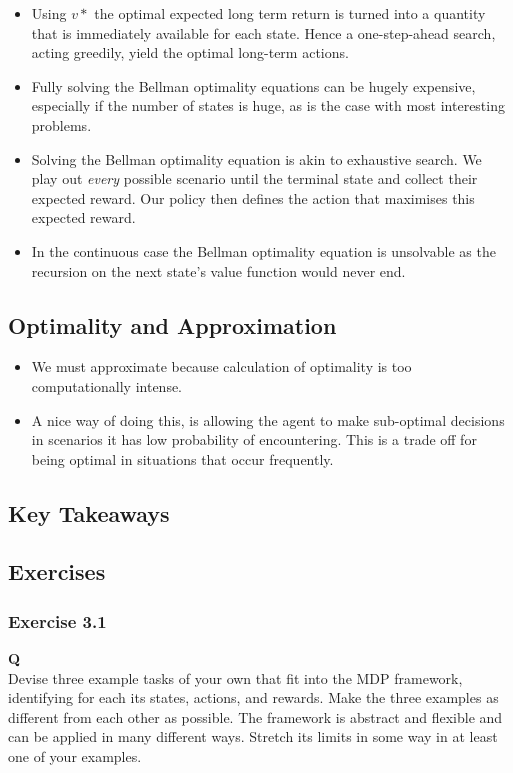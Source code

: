 \begin{itemize}
\item Using \(v*\) the optimal expected long term return is turned into a quantity that is immediately available for each state. Hence a one-step-ahead search, acting greedily, yield the optimal long-term actions.
\item Fully solving the Bellman optimality equations can be hugely expensive, especially if the number of states is huge, as is the case with most interesting problems.
\item Solving the Bellman optimality equation is akin to exhaustive search. We play out \textit{every} possible scenario until the terminal state and collect their expected reward. Our policy then defines the action that maximises this expected reward. 
\item In the continuous case the Bellman optimality equation is unsolvable as the recursion on the next state's value function would never end.
\end{itemize}

\subsection{Optimality and Approximation}
\begin{itemize}
	\item We must approximate because calculation of optimality is too computationally intense.
	\item A nice way of doing this, is allowing the agent to make sub-optimal decisions in scenarios it has low probability of encountering. This is a trade off for being optimal in situations that occur frequently.
\end{itemize}

\subsection{Key Takeaways}


\subsection{Exercises}
\subsubsection{Exercise 3.1}
\textbf{Q}\\
Devise three example tasks of your own that fit into the MDP framework, identifying for each its states, actions, and rewards. Make the three examples as different from each other as possible. The framework is abstract and flexible and can be applied in many different ways. Stretch its limits in some way in at least one of your examples.\\

